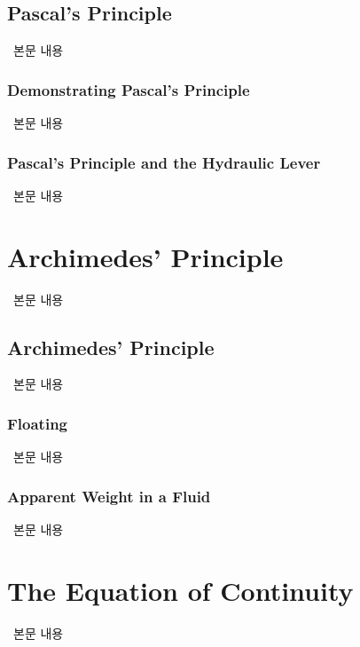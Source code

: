 \subsection{Pascal's Principle}
%
\ 본문 내용

\subsubsection{Demonstrating Pascal's Principle}
%
\ 본문 내용

\subsubsection{Pascal's Principle and the Hydraulic Lever}
%
\ 본문 내용

\section{Archimedes' Principle}
%
\ 본문 내용

\subsection{Archimedes' Principle}
%
\ 본문 내용

\subsubsection{Floating}
%
\ 본문 내용

\subsubsection{Apparent Weight in a Fluid}
%
\ 본문 내용

\section{The Equation of Continuity}
%
\ 본문 내용

